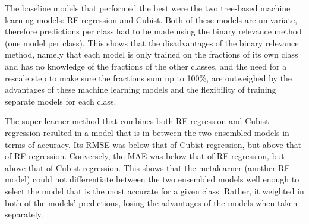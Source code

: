 \documentclass[review,authoryear,3p]{elsarticle}
\begin{document}
The baseline models that performed the best were the two tree-based machine learning models: \gls{RF} regression and Cubist.
Both of these models are univariate, therefore predictions per class had to be made using the binary relevance method (one model per class).
This shows that the disadvantages of the binary relevance method, namely that each model is only trained on the fractions of its own class and has no knowledge of the fractions of the other classes, and the need for a rescale step to make sure the fractions sum up to 100\%, are outweighed by the advantages of these machine learning models and the flexibility of training separate models for each class.

The super learner method that combines both \gls{RF} regression and Cubist regression resulted in a model that is in between the two ensembled models in terms of accuracy.
Its \gls{RMSE} was below that of Cubist regression, but above that of \gls{RF} regression.
Conversely, the \gls{MAE} was below that of \gls{RF} regression, but above that of Cubist regression.
This shows that the metalearner (another \gls{RF} model) could not differentiate between the two ensembled models well enough to select the model that is the most accurate for a given class.
Rather, it weighted in both of the models' predictions, losing the advantages of the models when taken separately.
\end{document}
